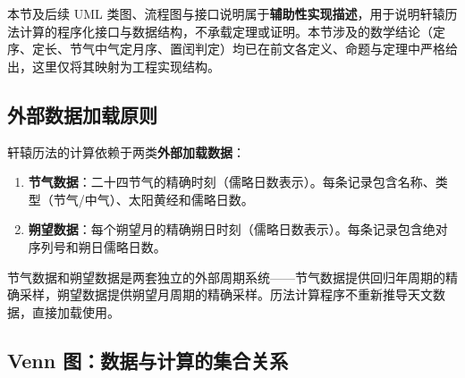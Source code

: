 \begin{remark}[本节定位]\label{rem:calendar_data_positioning}
本节及后续 UML 类图、流程图与接口说明属于\textbf{辅助性实现描述}，用于说明轩辕历法计算的程序化接口与数据结构，不承载定理或证明。本节涉及的数学结论（定序、定长、节气中气定月序、置闰判定）均已在前文各定义、命题与定理中严格给出，这里仅将其映射为工程实现结构。
\end{remark}

\subsection{外部数据加载原则}

\begin{definition}[外部数据加载原则]\label{def:external_data_loading}
轩辕历法的计算依赖于两类\textbf{外部加载数据}：
\begin{enumerate}[label=(\roman*)]
    \item \textbf{节气数据}：二十四节气的精确时刻（儒略日数表示）。每条记录包含名称、类型（节气/中气）、太阳黄经和儒略日数。
    \item \textbf{朔望数据}：每个朔望月的精确朔日时刻（儒略日数表示）。每条记录包含绝对序列号和朔日儒略日数。
\end{enumerate}
节气数据和朔望数据是两套独立的外部周期系统——节气数据提供回归年周期的精确采样，朔望数据提供朔望月周期的精确采样。历法计算程序不重新推导天文数据，直接加载使用。
\end{definition}

\subsection{Venn 图：数据与计算的集合关系}

